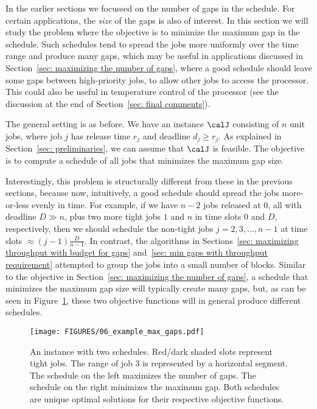 





In the earlier sections we focussed on the number of gaps in the schedule. For
certain applications,  the \emph{size} of the gaps is also of interest. 
In this section we will study the problem where the objective is to
minimize the maximum gap in the schedule. Such schedules
tend to spread the jobs more uniformly over the time range and
produce many gaps, which may be useful in applications
discussed in Section~\ref{sec: maximizing the number of gaps}, where a good
schedule should leave some gaps between high-priority jobs, to allow other
jobs to access the processor. This could also be useful in temperature
control of the processor (see the discussion at the end of Section~\ref{sec: final comments}).

The general setting is as before. We have an instance $\calJ$ consisting
of $n$ unit jobs, where job $j$ has release time $r_j$ and deadline $d_j\ge r_j$. 
As explained in Section~\ref{sec: preliminaries}, we can assume that $\calJ$ is feasible.
The objective is to compute a schedule of all jobs that minimizes the maximum gap size.

Interestingly, this problem is structurally different from these in the previous 
sections, because now, intuitively, a good schedule should
spread the jobs more-or-less evenly in time. For example, if we have $n-2$ jobs released 
at $0$, all with deadline $D \gg n$, plus two more tight jobs $1$ and $n$ in time slots $0$ and $D$, respectively,
then we should schedule the non-tight jobs $j = 2,3,...,n-1$
at time slots $\approx (j-1) \frac{D}{n-1}$. In contrast, the algorithms in
Sections~\ref{sec: maximizing throughput with budget for gaps} and~\ref{sec: min gaps with throughput requirement}
attempted to group the jobs into a small number of blocks. 
Similar to the objective in Section~\ref{sec: maximizing the number of gaps}, a schedule
that minimizes the maximum gap size will typically create many gaps, but,
as can be seen in Figure~\ref{fig: example max gaps}, these two objective functions
will in general produce different schedules.



\begin{figure}[ht]
\begin{center}
\texttt{[image: FIGURES/06\_example\_max\_gaps.pdf]}
\caption{An instance with two schedules. Red/dark shaded slots represent tight jobs.
The range of job $3$ is represented by a horizontal segment. The schedule on the left maximizes the
number of gaps. The schedule on the right minimizes the maximum gap. Both
schedules are unique optimal solutions for their respective objective functions.}
\label{fig: example max gaps}
\end{center}
\end{figure}




